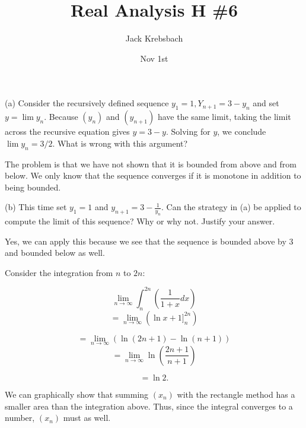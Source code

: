 \documentclass{report}
\title{Real Analysis H \#6}
\author{Jack Krebsbach }
\date{Nov 1st}
\begin{document}
\maketitle


(a) Consider the recursively defined sequence $y_1=1, Y_{n+1}=3-y_n$ and set $y=\lim y_n$. Because $\left(y_n\right)$ and $\left(y_{n+1}\right)$ have the same limit, taking the limit across the recursive equation gives $y=3-y$. Solving for $y$, we conclude $\lim y_n=3 / 2$. What is wrong with this argument?

\bigskip
\sol 

The problem is that we have not shown that it is bounded from above and from below. We only know that the sequence converges if it is monotone in addition to being bounded. 


\bigskip
(b) This time set $y_1=1$ and $y_{n+1}=3-\frac{1}{y_n}$. Can the strategy in (a) be applied to compute the limit of this sequence? Why or why not. Justify your answer.

\bigskip
\sol 

Yes, we can apply this because we see that the sequence is bounded above by 3 and bounded below as well.


\bigskip
{}

\begin{myproof}

Consider the integration from $n$ to $2n$:
 
$$ \lim_{n \rightarrow \infty} \int_{n}^{2n} \left( \frac{1}{1+x} dx  \right)$$
$$= \lim_{n \rightarrow \infty} \left(\ln x+1 ]_{n}^{2n} \right)$$

$$= \lim_{n \rightarrow \infty} \left(\ln (2n+1) - \ln (n+1) \right)$$
$$= \lim_{n \rightarrow \infty} \ln \left(\frac{2n+1}{n+1}\right)$$

$$=  \ln 2.$$

We can graphically show that summing $(x_n)$ with the rectangle method has a smaller area than the integration above. Thus, since the integral converges to a number, $(x_n)$ must as well. 

\end{myproof}


\pagebreak

\end{document}
